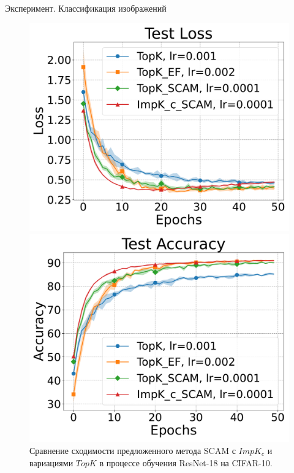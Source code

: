 \documentclass{beamer}
\begin{document}
\begin{frame}{Эксперимент. Классификация изображений}
\begin{figure}[ht]
\begin{minipage}{0.4\textwidth}
        \end{minipage}
        \begin{minipage}{0.4\textwidth}
            \includegraphics[width=\textwidth]{../paper/figures/resnet/experiment2/Test Loss.pdf}
        \end{minipage}
        \begin{minipage}{0.4\textwidth}
            \includegraphics[width=\textwidth]{../paper/figures/resnet/experiment2/Test Accuracy.pdf}
        \end{minipage}
        \caption{Сравнение сходимости предложенного метода SCAM с $ImpK_c$ и вариациями $TopK$ в процессе обучения ResNet-18 на CIFAR-10.}
    \end{figure}

\end{frame}
\end{document}
